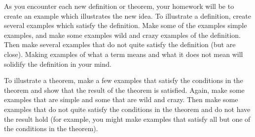 As you encounter each new definition or theorem, your homework will be to create an example which illustrates the new idea.  To illustrate a definition, create several examples which satisfy the definition.  Make some of the examples simple examples, and make some examples wild and crazy examples of the definition.  Then make several examples that do not quite satisfy the definition (but are close).  Making examples of what a term means and what it does not mean will solidify the definition in your mind.

To illustrate a theorem, make a few examples that satisfy the conditions in the theorem and show that the result of the theorem is satisfied.  Again, make some examples that are simple and some that are wild and crazy.  Then make some examples that do not quite satisfy the conditions in the theorem and do not have the result hold (for example, you might make examples that satisfy all but one of the conditions in the theorem).

%




